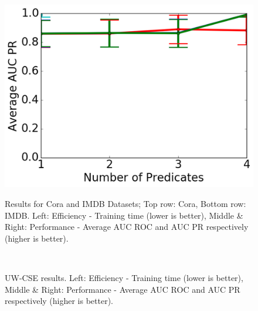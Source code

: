\documentclass[sigconf]{acmart}
\begin{document}
\begin{figure}[t]
{\centering
\includegraphics[width = 0.33\linewidth]{images/IMDBAverageAUCPR.png}
\label{fig:imdbPR}
}%
\\
%
\caption{Results for Cora and IMDB Datasets; Top row: Cora, Bottom row: IMDB. Left: Efficiency - Training time (lower is better), Middle \& Right: Performance - Average AUC ROC and AUC PR respectively (higher is better).}
\label{fig:results2}
\end{figure}


\begin{figure}[t]
%
%
%
\\
%
\caption{UW-CSE results. Left: Efficiency - Training time (lower is better), Middle \& Right: Performance - Average AUC ROC and AUC PR respectively (higher is better).}
\label{fig:results3}
\end{figure}
\end{document}
